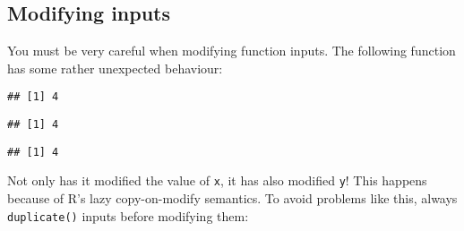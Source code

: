 \hypertarget{modifying-inputs}{%
\subsection{Modifying inputs}\label{modifying-inputs}}

You must be very careful when modifying function inputs. The following
function has some rather unexpected behaviour:

\begin{Shaded}
\begin{Highlighting}[]
\StringTok{ }\NormalTok{(}\NormalTok{(} \NormalTok{), }
\NormalTok{)}
\StringTok{ }
\StringTok{ }
\end{Highlighting}
\end{Shaded}

\begin{verbatim}
## [1] 4
\end{verbatim}

\begin{Shaded}
\begin{Highlighting}[]
\end{Highlighting}
\end{Shaded}

\begin{verbatim}
## [1] 4
\end{verbatim}

\begin{Shaded}
\begin{Highlighting}[]
\end{Highlighting}
\end{Shaded}

\begin{verbatim}
## [1] 4
\end{verbatim}

Not only has it modified the value of \texttt{x}, it has also modified
\texttt{y}! This happens because of R's lazy copy-on-modify semantics.
To avoid problems like this, always \texttt{duplicate()} inputs before
modifying them:

\begin{Shaded}
\begin{Highlighting}[]
\StringTok{ }\NormalTok{(}\NormalTok{(} \NormalTok{), }
\NormalTok{)}
\StringTok{ }
\StringTok{ }
\end{Highlighting}
\end{Shaded}

